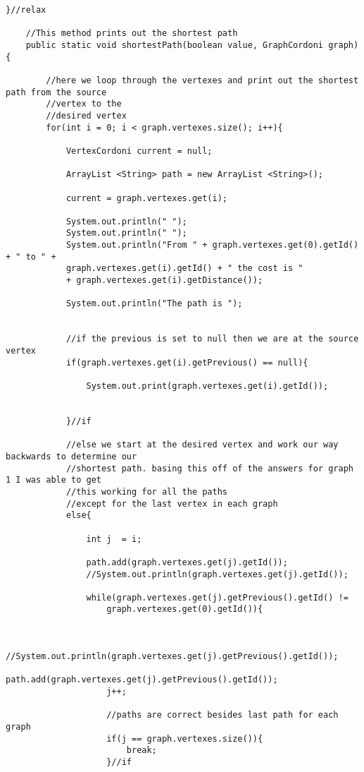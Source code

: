 \documentclass[letterpaper, 10pt,DIV=13]{scrartcl}
\numberwithin{equation}{section} %
\numberwithin{figure}{section} %
\numberwithin{table}{section} %
\begin{document}
\begin{lstlisting}[frame=single, ]
    }//relax

    //This method prints out the shortest path
    public static void shortestPath(boolean value, GraphCordoni graph) {

        //here we loop through the vertexes and print out the shortest path from the source 
        //vertex to the 
        //desired vertex
        for(int i = 0; i < graph.vertexes.size(); i++){

            VertexCordoni current = null;

            ArrayList <String> path = new ArrayList <String>();

            current = graph.vertexes.get(i);

            System.out.println(" ");
            System.out.println(" ");
            System.out.println("From " + graph.vertexes.get(0).getId() + " to " +
            graph.vertexes.get(i).getId() + " the cost is " 
            + graph.vertexes.get(i).getDistance());

            System.out.println("The path is ");

            
            //if the previous is set to null then we are at the source vertex
            if(graph.vertexes.get(i).getPrevious() == null){

                System.out.print(graph.vertexes.get(i).getId());

            
            }//if

            //else we start at the desired vertex and work our way backwards to determine our 
            //shortest path. basing this off of the answers for graph 1 I was able to get 
            //this working for all the paths 
            //except for the last vertex in each graph
            else{

                int j  = i;

                path.add(graph.vertexes.get(j).getId());
                //System.out.println(graph.vertexes.get(j).getId());

                while(graph.vertexes.get(j).getPrevious().getId() != 
                    graph.vertexes.get(0).getId()){
                    
 
                    //System.out.println(graph.vertexes.get(j).getPrevious().getId());
                    path.add(graph.vertexes.get(j).getPrevious().getId());
                    j++;
                    
                    //paths are correct besides last path for each graph
                    if(j == graph.vertexes.size()){
                        break;
                    }//if


\end{lstlisting}
\end{document}
